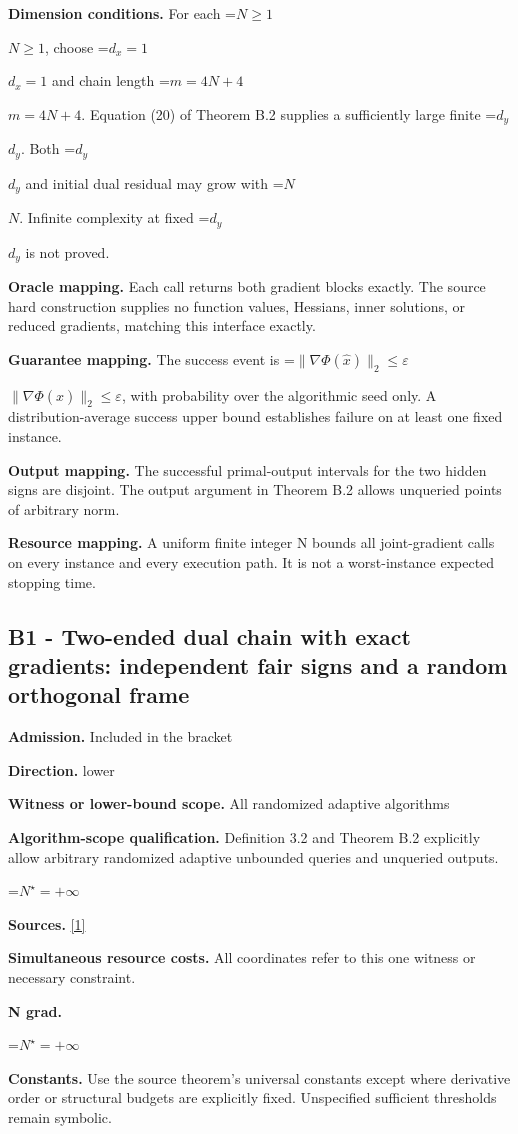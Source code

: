 \documentclass[10pt,a4paper]{article}
\newcommand{\AtlasMath}[1]{\par\begingroup\centering\setbox0=\hbox{$\displaystyle #1$}\ifdim\wd0>1.4\linewidth\typeout{ATLAS WIDE FORMULA: \the\wd0}\fi\ifdim\wd0>\linewidth\resizebox{\linewidth}{!}{\box0}\else\box0\fi\par\endgroup}
\newcommand{\AtlasInlineMath}[1]{\begingroup\setbox0=\hbox{$#1$}\ifdim\wd0>.4\linewidth\endgroup\AtlasMath{#1}\else\endgroup$#1$\fi}
\begin{document}
\textbf{Dimension conditions.} For each \AtlasInlineMath{N\ge1}, choose \AtlasInlineMath{d_x=1} and chain length \AtlasInlineMath{m=4N+4}. Equation (20) of Theorem B.2 supplies a sufficiently large finite \AtlasInlineMath{d_y}. Both \AtlasInlineMath{d_y} and initial dual residual may grow with \AtlasInlineMath{N}. Infinite complexity at fixed \AtlasInlineMath{d_y} is not proved.

\textbf{Oracle mapping.} Each call returns both gradient blocks exactly. The source hard construction supplies no function values, Hessians, inner solutions, or reduced gradients, matching this interface exactly.

\textbf{Guarantee mapping.} The success event is \AtlasInlineMath{\|\nabla\Phi(\widehat x)\|_2\le\varepsilon}, with probability over the algorithmic seed only. A distribution-average success upper bound establishes failure on at least one fixed instance.

\textbf{Output mapping.} The successful primal-output intervals for the two hidden signs are disjoint. The output argument in Theorem B.2 allows unqueried points of arbitrary norm.

\textbf{Resource mapping.} A uniform finite integer N bounds all joint-gradient calls on every instance and every execution path. It is not a worst-instance expected stopping time.

\subsection{B1 - Two-ended dual chain with exact gradients: independent fair signs and a random orthogonal frame}
\textbf{Admission.} Included in the bracket

\textbf{Direction.} lower

\textbf{Witness or lower-bound scope.} All randomized adaptive algorithms

\textbf{Algorithm-scope qualification.} Definition 3.2 and Theorem B.2 explicitly allow arbitrary randomized adaptive unbounded queries and unqueried outputs.

\AtlasMath{N^\star=+\infty}
\textbf{Sources.} \href{https://arxiv.org/pdf/2610.00229v2}{[1]}

\textbf{Simultaneous resource costs.} All coordinates refer to this one witness or necessary constraint.

\textbf{N grad.}

\AtlasMath{N^\star=+\infty}
\textbf{Constants.} Use the source theorem’s universal constants except where derivative order or structural budgets are explicitly fixed. Unspecified sufficient thresholds remain symbolic.
\end{document}
